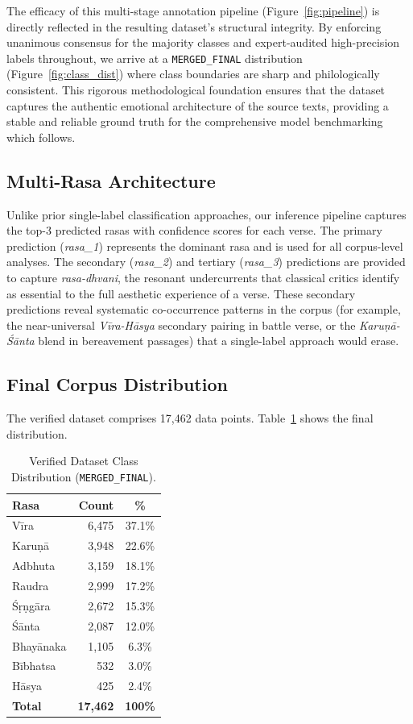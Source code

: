 \documentclass[11pt]{article}
\begin{document}
The efficacy of this multi-stage annotation pipeline (Figure~\ref{fig:pipeline}) is directly reflected in the resulting dataset's structural integrity. By enforcing unanimous consensus for the majority classes and expert-audited high-precision labels throughout, we arrive at a \texttt{MERGED\_FINAL} distribution (Figure~\ref{fig:class_dist}) where class boundaries are sharp and philologically consistent. This rigorous methodological foundation ensures that the dataset captures the authentic emotional architecture of the source texts, providing a stable and reliable ground truth for the comprehensive model benchmarking which follows.

\subsection{Multi-Rasa Architecture}

Unlike prior single-label classification approaches, our inference pipeline captures the top-3 predicted rasas with confidence scores for each verse. The primary prediction (\textit{rasa\_1}) represents the dominant rasa and is used for all corpus-level analyses. The secondary (\textit{rasa\_2}) and tertiary (\textit{rasa\_3}) predictions are provided to capture \textit{rasa-dhvani}, the resonant undercurrents that classical critics identify as essential to the full aesthetic experience of a verse. These secondary predictions reveal systematic co-occurrence patterns in the corpus (for example, the near-universal \textit{V\=ira-H\=asya} secondary pairing in battle verse, or the \textit{Karu\d n\=a-Ś\=anta} blend in bereavement passages) that a single-label approach would erase.

\subsection{Final Corpus Distribution}

The verified dataset comprises 17,462 data points. Table~\ref{tab:final_dist} shows the final distribution.

\begin{table}[htbp]
\centering
\small
\caption{Verified Dataset Class Distribution (\texttt{MERGED\_FINAL}).}
\label{tab:final_dist}
\begin{tabular}{lrc}
\toprule
Rasa & Count & \% \\
\midrule
V\=ira       & 6,475 & 37.1\% \\
Karu\d n\=a  & 3,948 & 22.6\% \\
Adbhuta      & 3,159 & 18.1\% \\
Raudra       & 2,999 & 17.2\% \\
Ś\d r\d ng\=ara & 2,672 & 15.3\% \\
Ś\=anta      & 2,087 & 12.0\% \\
Bhay\=anaka & 1,105 &  6.3\% \\
B\=ibhatsa   &   532 &  3.0\% \\
H\=asya      &   425 &  2.4\% \\
\midrule
\textbf{Total} & \textbf{17,462} & \textbf{100\%} \\
\bottomrule
\end{tabular}
\end{table}
\end{document}
